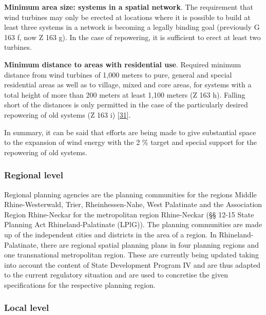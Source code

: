 \documentclass[a4paper,11pt]{article}
\begin{document}
\textbf{Minimum area size: systems in a spatial network}. The requirement that wind turbines may only be erected at locations where it is possible to build at least three systems in a network is becoming a legally binding goal (previously G 163 f, now Z 163 g). In the case of repowering, it is sufficient to erect at least two turbines.

\textbf{Minimum distance to areas with residential use}. Required minimum distance from wind turbines of 1,000 meters to pure, general and special residential areas as well as to village, mixed and core areas, for systems with a total height of more than 200 meters at least 1,100 meters (Z 163 h). Falling short of the distances is only permitted in the case of the particularly desired repowering of old systems (Z 163 i) {[}\protect\hyperlink{ref-MinisteriumdesInnernundfurSport.2017}{31}{]}.

In summary, it can be said that efforts are being made to give substantial space to the expansion of wind energy with the 2 \% target and special support for the repowering of old systems.

\hypertarget{regional-level}{%
\subsubsection{Regional level}\label{regional-level}}

Regional planning agencies are the planning communities for the regions Middle Rhine-Westerwald, Trier, Rheinhessen-Nahe, West Palatinate and the Association Region Rhine-Neckar for the metropolitan region Rhine-Neckar (§§ 12-15 State Planning Act Rhineland-Palatinate (LPlG)). The planning communities are made up of the independent cities and districts in the area of a region. In Rhineland-Palatinate, there are regional spatial planning plans in four planning regions and one transnational metropolitan region. These are currently being updated taking into account the content of State Development Program IV and are thus adapted to the current regulatory situation and are used to concretise the given specifications for the respective planning region.

\hypertarget{local-level}{%
\subsubsection{Local level}\label{local-level}}
\end{document}
